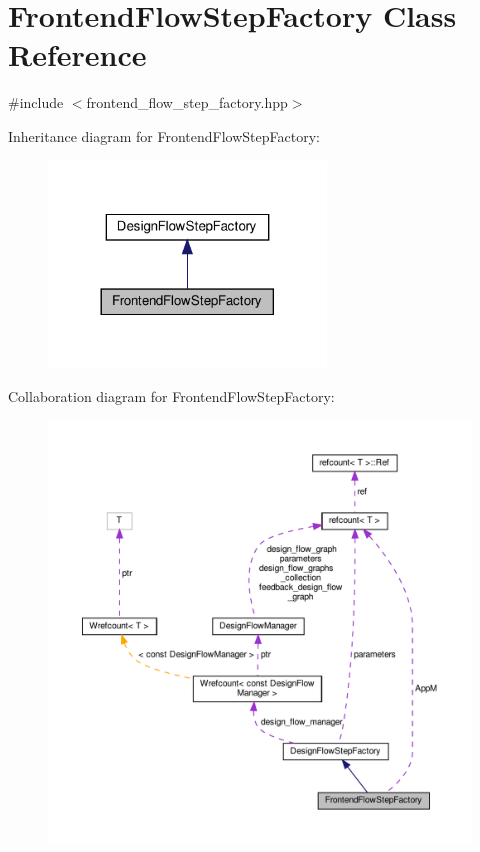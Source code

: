 \hypertarget{classFrontendFlowStepFactory}{}\section{Frontend\+Flow\+Step\+Factory Class Reference}
\label{classFrontendFlowStepFactory}


{\ttfamily \#include $<$frontend\+\_\+flow\+\_\+step\+\_\+factory.\+hpp$>$}



Inheritance diagram for Frontend\+Flow\+Step\+Factory\+:
\nopagebreak
\begin{figure}[H]
\begin{center}
\leavevmode
\includegraphics[width=209pt]{d4/d3c/classFrontendFlowStepFactory__inherit__graph}
\end{center}
\end{figure}


Collaboration diagram for Frontend\+Flow\+Step\+Factory\+:
\nopagebreak
\begin{figure}[H]
\begin{center}
\leavevmode
\includegraphics[width=350pt]{dc/dd1/classFrontendFlowStepFactory__coll__graph}
\end{center}
\end{figure}

